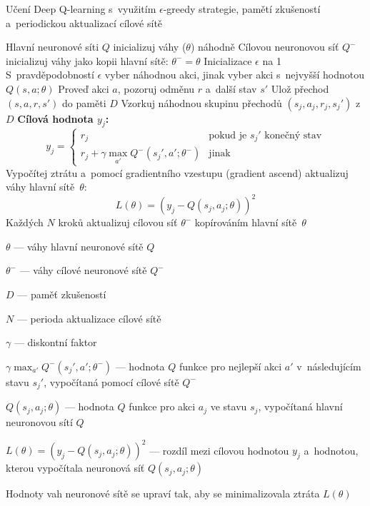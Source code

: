 \begin{algorithm}[H]
  \caption{Učení Deep Q-learning s~využitím $\epsilon$-greedy strategie, pamětí zkušeností a~periodickou aktualizací cílové sítě}
  \begin{algorithmic}[1]
    \State Hlavní neuronové síti $Q$ inicializuj váhy ($\theta$) náhodně
    \State Cílovou neuronovou síť $Q^{-}$ inicializuj váhy jako kopii hlavní sítě: $\theta^{-} = \theta$
    \State Inicializace $\epsilon$ na 1
            \State S~pravděpodobností $\epsilon$ vyber náhodnou akci, jinak vyber akci s~nejvyšší hodnotou $Q(s, a; \theta)$
            \State Proveď akci $a$, pozoruj odměnu $r$ a~další stav $s'$
            \State Ulož přechod $(s, a, r, s')$ do paměti $D$
              \State Vzorkuj náhodnou skupinu přechodů $(s_j, a_j, r_j, s_j')$ z~$D$
                  \State \textbf{Cílová hodnota $y_j$:}
                  \[
                  y_j = 
                  \begin{cases} 
                  r_j & \text{pokud je } s_j' \text{ konečný stav} \\
                  r_j + \gamma \max_{a'} Q^{-}(s_j', a'; \theta^{-}) & \text{jinak}
                  \end{cases}
                  \]
                  \State Vypočítej ztrátu a~pomocí gradientního vzestupu (gradient ascend) aktualizuj váhy hlavní sítě~$\theta$:
                   \[
                  L(\theta) = \left(y_j - Q(s_j, a_j; \theta)\right)^2
                  \]
              \EndFor
            \EndIf
            \State Každých $N$ kroků aktualizuj cílovou síť $\theta^{-}$ kopírováním hlavní sítě~$\theta$
      \EndFor
    \EndFor
  \end{algorithmic}
\end{algorithm}
\begin{myitemize}
  \item \(\theta\) --- váhy hlavní neuronové sítě \(Q\)
  \item \(\theta^{-}\) --- váhy cílové neuronové sítě \(Q^{-}\)
  \item $D$ --- paměť zkušeností
  \item $N$ --- perioda aktualizace cílové sítě
  \item $\gamma$ --- diskontní faktor
  \item $\gamma \max_{a'} Q^{-}(s_j', a'; \theta^{-})$ --- hodnota $Q$ funkce pro nejlepší akci $a'$ v~následujícím stavu $s_j'$, vypočítaná pomocí cílové sítě $Q^{-}$
  \item $Q(s_j, a_j; \theta)$ --- hodnota $Q$ funkce pro akci $a_j$ ve stavu $s_j$, vypočítaná hlavní neuronovou sítí $Q$
  \item $L(\theta) = \left(y_j - Q(s_j, a_j; \theta)\right)^2$ --- rozdíl mezi cílovou hodnotou $y_j$ a~hodnotou, kterou vypočítala neuronová síť $Q(s_j, a_j; \theta)$
  \item Hodnoty vah neuronové sítě se upraví tak, aby se minimalizovala ztráta $L(\theta)$
\end{myitemize}
